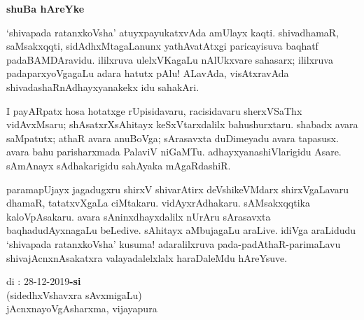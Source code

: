 \begin{center}
{\Huge\bfseries shuBa hAreYke}
\end{center}

\bigskip

`shivapada ratanxkoVsha' atuyxpayukatxvAda amUlayx kaqti. shivadhamaR, saMsakxqqti, sidAdhxMtagaLanunx yathAvatAtxgi paricayisuva baqhatf padaBAMDAravidu. ililxruva ulelxVKagaLu nAlUkxvare sahasarx; ililxruva padaparxyoVgagaLu adara hatutx pAlu! ALavAda, visAtxravAda shivadashaRnAdhayxyanakekx idu sahakAri.

\medskip

I payARpatx hosa hotatxge rUpisidavaru, racisidavaru sherxVSaThx vidAvxMsaru; shAsatxrXsAhitayx keSxVtarxdalilx bahushurxtaru. shabadx avara saMpatutx; athaR avara anuBoVga; sArasavxta duDimeyadu avara tapasusx. avara bahu parisharxmada PalaviV niGaMTu. adhayxyana\-shiVlarigidu Asare. sAmAnayx sAdhakarigidu sahAyaka mAgaRdashiR.

\medskip

paramapUjayx jagadugxru shirxV shivarAtirx deVshikeVMdarx shirxVgaLavaru dhamaR, tatatxvXgaLa ciMtakaru. vidAyxrAdhakaru. sAMsakxqqtika kaloVpAsakaru. avara sAninxdhayxdalilx nUrAru sArasavxta baqhadudAyxnagaLu beLedive. sAhitayx aMbujagaLu araLive. idiVga araLidudu `shivapada ratanxkoVsha' kusuma! adaralilxruva pada-padAthaR-parimaLavu shivajAcnxnAsakatxra valayadalelxlalx haraDaleMdu hAreYsuve.

\vskip 1.5cm

\noindent
di : 28-12-2019\hfill {\bf -si}\hspace{1.7cm}\,\\
\phantom{aa}\hfill (sidedhxVshavxra sAvxmigaLu)\quad\,\\
\phantom{a} \hfill jAcnxnayoVgAsharxma, vijayapura
